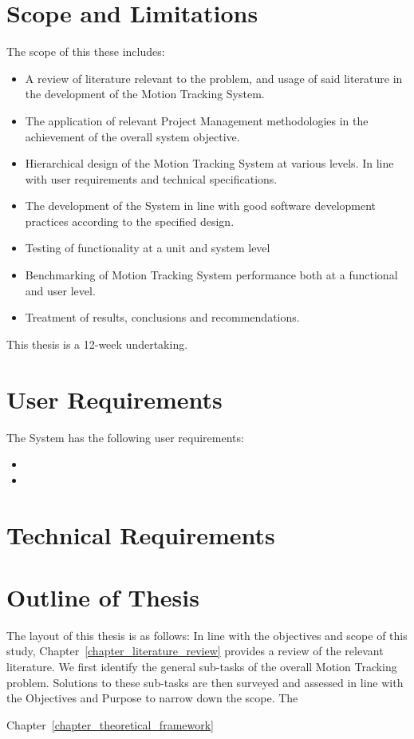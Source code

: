 \section{Scope and Limitations}
The scope of this these includes: 
\begin{itemize}
    \item A review of literature relevant to the problem, and usage of
        said literature in the development of the Motion Tracking System.
    \item The application of relevant Project Management methodologies in the
        achievement of the overall system objective.
    \item Hierarchical design of the Motion Tracking System at various levels.
        In line with user requirements and technical specifications.
    \item The development of the System in line with good software development
        practices according to the specified design.
    \item Testing of functionality at a unit and system level
    \item Benchmarking of Motion Tracking System performance both at a
        functional and user level.
    \item Treatment of results, conclusions and recommendations.
\end{itemize}

This thesis is a 12-week undertaking.

\section{User Requirements}
The System has the following user requirements:
\begin{itemize}
    \item  
    \item
\end{itemize}

\section{Technical Requirements}


\section{Outline of Thesis}
The layout of this thesis is as follows: In line with the objectives and scope
of this study, Chapter~\ref{chapter_literature_review} provides a review of the
relevant literature. We first identify the general sub-tasks of the overall
Motion Tracking problem. Solutions to these sub-tasks are then surveyed and
assessed in line with the Objectives and Purpose to narrow down the scope. The

Chapter~\ref{chapter_theoretical_framework}  



